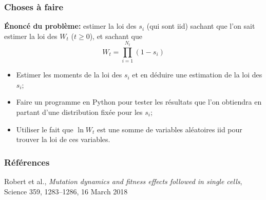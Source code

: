 \documentclass{beamer}
\begin{document}
\begin{frame}
  \frametitle{Choses à faire}
  \textbf{Énoncé du problème:} estimer la loi des $s_i$ (qui sont iid) sachant que l'on sait estimer la loi des $W_t$ ($t\geqslant 0$), et sachant que \[W_t=\prod_{i=1}^{N_t}(1-s_i)\]
  \pause
  \begin{itemize}[label=\bullet]
  \item Estimer les moments de la loi des $s_i$ et en déduire une estimation de la loi des $s_i$;
  \item Faire un programme en Python pour tester les résultats que l'on obtiendra en partant d'une distribution fixée pour les $s_i$;
  \item Utiliser le fait que $\ln{W_t}$ est une somme de variables aléatoires iid pour trouver la loi de ces variables.
  \end{itemize}
\end{frame}

  \begin{frame}
    \frametitle{Références}
\begin{thebibliography}{1}

  Robert et al.,
  \emph{Mutation dynamics and fitness effects followed in single cells}, Science 359, 1283–1286, 16 March 2018
  
\end{thebibliography}


\end{frame}
\end{document}
